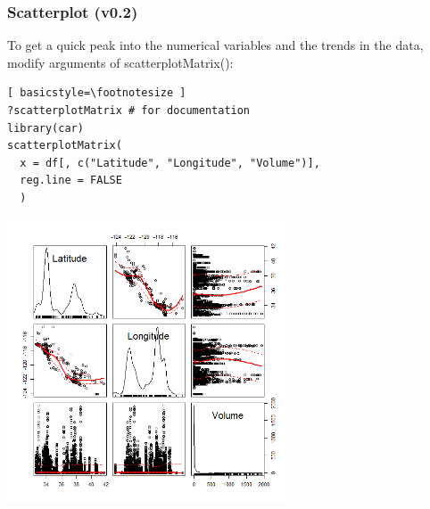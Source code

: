 \begin{frame}
\frametitle{Scatterplot (v0.2)}

To get a quick peak into the numerical variables and the trends in the data, modify arguments of \ttfamily scatterplotMatrix(): \normalfont
  		\begin{lstlisting}[ basicstyle=\footnotesize ]
?scatterplotMatrix # for documentation
library(car)		
scatterplotMatrix(
  x = df[, c("Latitude", "Longitude", "Volume")], 
  reg.line = FALSE
  )
		\end{lstlisting}

        \begin{center}
         \includegraphics[width=0.63\textwidth]{images/scatterPlot_v1.png}
        \end{center}
\end{frame}

